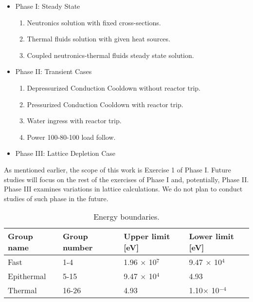 \documentclass[11pt,letterpaper]{article}
\begin{document}
\begin{itemize}
        \item Phase I: Steady State
        \begin{enumerate}
            \item Neutronics solution with fixed cross-sections. 
            \item Thermal fluids solution with given heat sources.
            \item Coupled neutronics-thermal fluids steady state solution.
        \end{enumerate}

        \item Phase II: Transient Cases
        \begin{enumerate}
            \item Depressurized Conduction Cooldown without reactor trip.
            \item Pressurized Conduction Cooldown with reactor trip.
            \item Water ingress with reactor trip.
            \item Power 100-80-100 load follow.
        \end{enumerate}

        \item Phase III: Lattice Depletion Case
\end{itemize}

As mentioned earlier, the scope of this work is Exercise 1 of Phase I.
Future studies will focus on the rest of the exercises of Phase I and, potentially, Phase II.
Phase III examines variations in lattice calculations.
We do not plan to conduct studies of such phase in the future.




\begin{table}[htbp!]
  \centering
  \caption{Energy boundaries.}
  \label{tab:group-struct}
  \begin{tabular}{@{}l l l l}
  \toprule
  Group name & Group number & Upper limit [eV] & Lower limit [eV]       \\
  \midrule
  Fast          & 1-4     & 1.96 $\times$ 10$^7$ & 9.47 $\times$ 10$^4$ \\
  Epithermal    & 5-15    & 9.47 $\times$ 10$^4$ & 4.93   \\
  Thermal       & 16-26   & 4.93 & 1.10$\times$ 10$^{-4}$ \\
  \bottomrule
  \end{tabular}
\end{table}











\pagebreak


\end{document}
